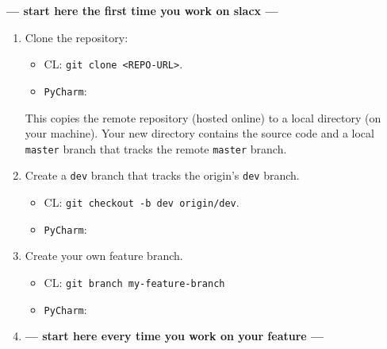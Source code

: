 \textbf{--- start here the first time you work on slacx ---} 
\begin{enumerate} 
    \item Clone the repository: 
    \begin{itemize} 
        \item CL: \verb|git clone <REPO-URL>|. 
        \item \verb|PyCharm|:  
    \end{itemize} 
    This copies the remote repository (hosted online)
    to a local directory (on your machine). 
    Your new directory contains the source code
    and a local \verb|master| branch 
    that tracks the remote \verb|master| branch.
    \item Create a \verb|dev| branch that tracks the origin's \verb|dev| branch.
    \begin{itemize} 
        \item CL: \verb|git checkout -b dev origin/dev|. 
        \item \verb|PyCharm|: 
    \end{itemize} 
    \item Create your own feature branch. 
    \label{itm:init_laststep}
    \begin{itemize} 
        \item CL: \verb|git branch my-feature-branch| 
        \item \verb|PyCharm|:  
    \end{itemize} 
    \item \textbf{--- start here every time you work on your feature ---}

\end{enumerate}
